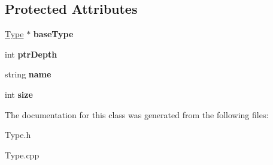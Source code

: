 \subsection*{Protected Attributes}
\begin{DoxyCompactItemize}
\item 
\hypertarget{classPointerType_a6938724924c94ba9f7cdf077992e8bfb}{\hyperlink{classType}{Type} $\ast$ {\bfseries base\-Type}}\label{classPointerType_a6938724924c94ba9f7cdf077992e8bfb}

\item 
\hypertarget{classPointerType_acae06a11545eafb06ea7cfba23529baa}{int {\bfseries ptr\-Depth}}\label{classPointerType_acae06a11545eafb06ea7cfba23529baa}

\item 
\hypertarget{classType_ad7eeefba3dfcecbdaa98d46aaa84e389}{string {\bfseries name}}\label{classType_ad7eeefba3dfcecbdaa98d46aaa84e389}

\item 
\hypertarget{classType_a871302dc63ac1a37c0b6a225cf82048d}{int {\bfseries size}}\label{classType_a871302dc63ac1a37c0b6a225cf82048d}

\end{DoxyCompactItemize}


The documentation for this class was generated from the following files\-:\begin{DoxyCompactItemize}
\item 
Type.\-h\item 
Type.\-cpp\end{DoxyCompactItemize}
